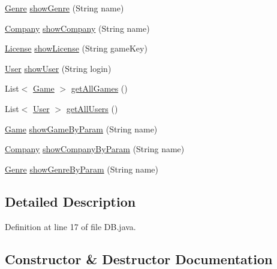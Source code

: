 \begin{DoxyCompactItemize}
\hyperlink{classes_1_1deusto_1_1server_1_1db_1_1data_1_1_genre}{Genre} \hyperlink{classes_1_1deusto_1_1server_1_1db_1_1_d_b_a207ddeb183db925dc20f095033aa4d94}{show\+Genre} (String name)
\item 
\hyperlink{classes_1_1deusto_1_1server_1_1db_1_1data_1_1_company}{Company} \hyperlink{classes_1_1deusto_1_1server_1_1db_1_1_d_b_ab5edf3ae158bb0501a882b1d724cc2a8}{show\+Company} (String name)
\item 
\hyperlink{classes_1_1deusto_1_1server_1_1db_1_1data_1_1_license}{License} \hyperlink{classes_1_1deusto_1_1server_1_1db_1_1_d_b_add49bccfecff6217efd34b4656572ed6}{show\+License} (String game\+Key)
\item 
\hyperlink{classes_1_1deusto_1_1server_1_1db_1_1data_1_1_user}{User} \hyperlink{classes_1_1deusto_1_1server_1_1db_1_1_d_b_ac85523faea523033439a932bbcab2c7e}{show\+User} (String login)
\item 
List$<$ \hyperlink{classes_1_1deusto_1_1server_1_1db_1_1data_1_1_game}{Game} $>$ \hyperlink{classes_1_1deusto_1_1server_1_1db_1_1_d_b_ad878c1c58062596b5e1b582ed496bd11}{get\+All\+Games} ()
\item 
List$<$ \hyperlink{classes_1_1deusto_1_1server_1_1db_1_1data_1_1_user}{User} $>$ \hyperlink{classes_1_1deusto_1_1server_1_1db_1_1_d_b_a245d98f8d670e29804a28d60daa7835b}{get\+All\+Users} ()
\item 
\hyperlink{classes_1_1deusto_1_1server_1_1db_1_1data_1_1_game}{Game} \hyperlink{classes_1_1deusto_1_1server_1_1db_1_1_d_b_a4fc9590d7e5643184ef89c3f03468e7e}{show\+Game\+By\+Param} (String name)
\item 
\hyperlink{classes_1_1deusto_1_1server_1_1db_1_1data_1_1_company}{Company} \hyperlink{classes_1_1deusto_1_1server_1_1db_1_1_d_b_a777cd6a4714b8a2838bd2e719f05336f}{show\+Company\+By\+Param} (String name)
\item 
\hyperlink{classes_1_1deusto_1_1server_1_1db_1_1data_1_1_genre}{Genre} \hyperlink{classes_1_1deusto_1_1server_1_1db_1_1_d_b_ad3da93de99d7123529260d5dd966f178}{show\+Genre\+By\+Param} (String name)
\end{DoxyCompactItemize}


\subsection{Detailed Description}


Definition at line 17 of file D\+B.\+java.



\subsection{Constructor \& Destructor Documentation}
\mbox{\label{classes_1_1deusto_1_1server_1_1db_1_1_d_b_ab53f32f36928ba9aa3ddff65fce395dc}} 
